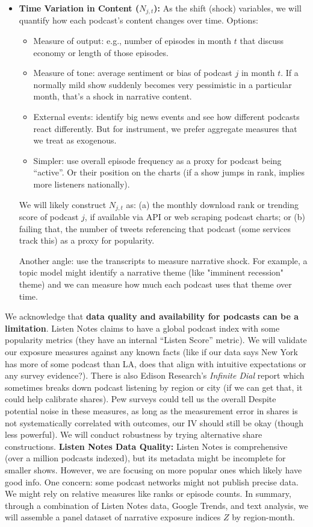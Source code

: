 \documentclass[12pt]{article}
\begin{document}
\begin{itemize}
    \item \textbf{Time Variation in Content ($N_{j,t}$):} As the shift (shock) variables, we will quantify how each podcast's content changes over time. Options:
          \begin{itemize}
              \item Measure of output: e.g., number of episodes in month $t$ that discuss economy or length of those episodes.
              \item Measure of tone: average sentiment or bias of podcast $j$ in month $t$. If a normally mild show suddenly becomes very pessimistic in a particular month, that's a shock in narrative content.
              \item External events: identify big news events and see how different podcasts react differently. But for instrument, we prefer aggregate measures that we treat as exogenous.
              \item Simpler: use overall episode frequency as a proxy for podcast being ``active''. Or their position on the charts (if a show jumps in rank, implies more listeners nationally).
          \end{itemize}
          We will likely construct $N_{j,t}$ as: (a) the monthly download rank or trending score of podcast $j$, if available via API or web scraping podcast charts; or (b) failing that, the number of tweets referencing that podcast (some services track this) as a proxy for popularity.

          Another angle: use the transcripts to measure narrative shock. For example, a topic model might identify a narrative theme (like "imminent recession" theme) and we can measure how much each podcast uses that theme over time.
\end{itemize}
We acknowledge that \textbf{data quality and availability for podcasts can be a limitation}. Listen Notes claims to have a global podcast index with some popularity metrics (they have an internal ``Listen Score'' metric). We will validate our exposure measures against any known facts (like if our data says New York has more of some podcast than LA, does that align with intuitive expectations or any survey evidence?).
There is also Edison Research's \emph{Infinite Dial} report which sometimes breaks down podcast listening by region or city (if we can get that, it could help calibrate shares). Pew surveys could tell us the overall %
Despite potential noise in these measures, as long as the measurement error in shares is not systematically correlated with outcomes, our IV should still be okay (though less powerful). We will conduct robustness by trying alternative share constructions.
\textbf{Listen Notes Data Quality:} Listen Notes is comprehensive (over a million podcasts indexed), but its metadata might be incomplete for smaller shows. However, we are focusing on more popular ones which likely have good info. One concern: some podcast networks might not publish precise data. We might rely on relative measures like ranks or episode counts.
In summary, through a combination of Listen Notes data, Google Trends, and text analysis, we will assemble a panel dataset of narrative exposure indices $Z$ by region-month.
\end{document}
